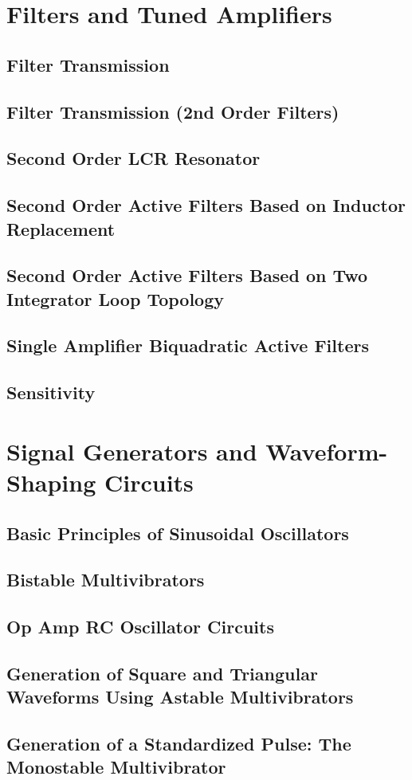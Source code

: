 \documentclass[11pt]{article}
\begin{document}

    \section{Filters and Tuned Amplifiers}
    \subsection{Filter Transmission}
    \subsection{Filter Transmission (2nd Order Filters)}
    \subsection{Second Order LCR Resonator}
    \subsection{Second Order Active Filters Based on Inductor Replacement}
    \subsection{Second Order Active Filters Based on Two Integrator Loop Topology}
    \subsection{Single Amplifier Biquadratic Active Filters}
    \subsection{Sensitivity}


    \section{Signal Generators and Waveform-Shaping Circuits}
    \subsection{Basic Principles of Sinusoidal Oscillators}
    \subsection{Bistable Multivibrators}
    \subsection{Op Amp RC Oscillator Circuits}
    \subsection{Generation of Square and Triangular Waveforms Using Astable Multivibrators}
    \subsection{Generation of a Standardized Pulse: The Monostable Multivibrator}
    
\end{document}
